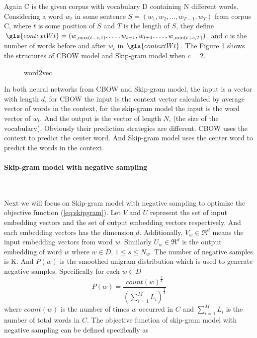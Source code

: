 Again \gls{C} is the given corpus with vocabulary \gls{D} containing  \gls{N} different words. Considering a word $w_t$ in some sentence $S = (w_1,w_2,\ldots,w_{T-1},w_{T})$ from corpus \gls{C}, where $t$ is some position of $S$ and $T$ is the length of $S$, they define\\
$\gls{contextWt} = (w_{,\max(t-c,1)},\ldots,w_{t-1},w_{t+1},\ldots,w_{,\min(t+c,T)})$, and $c$ is the number of words before and after $w_t$ in  $\gls{contextWt} $. The Figure \ref{fig:word2vec} shows the structures of CBOW model and Skip-gram model when $c=2$. 
\begin{figure}[!ht]
  \centering
	\caption{word2vec}
	\label{fig:word2vec}
\end{figure}

In both neural networks from CBOW and Skip-gram model, the input is a vector with length $d$, for CBOW the input is the context vector calculated by average vector of words in the context, for the skip-gram model the input is the word vector of $w_t$. And the output is the vector of length $N$, (the size of the vocabulary). Obviously their prediction strategies are different. CBOW uses the context to predict the center word. And Skip-gram model uses the center word to predict the words in the context.  

\paragraph{Skip-gram model with negative sampling}\ 

Next we will focus on Skip-gram model with negative sampling to optimize the objective function  (\ref{eq:skipgram}). Let $V$ and $U$ represent  the set of input embedding vectors and the set of output embedding vectors respectively. And each embedding vectors has the dimension $d$. Additionally, $V_{w} \in \Re^d$ %
means the input embedding vectors from word $w$. Similarly
$U_{w} \in \Re^d$ %
is the output embedding of word $w$ where  $w\in D$, $1\leq s\leq N_w$. The number of negative samples is \gls{K}. %
And $P(w)$ is the smoothed unigram distribution which is used to generate negative samples. Specifically for each $w\in D$
$$P(w) = \frac{count(w)^{\frac{3}{4}}}{(\sum_{i=1}^M L_i)^{\frac{3}{4}}}$$ 
where $count(w)$ is the number of times $w$ occurred in $C$ and $\sum_{i=1}^M L_i$ is the number of total words in $C$. The objective function of skip-gram model with negative sampling can be defined specifically as

